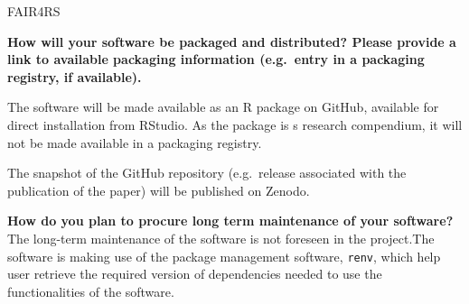\documentclass[
  letterpaper,
  DIV=11,
  numbers=noendperiod]{scrartcl}
\begin{document}
FAIR4RS

\textbf{How will your software be packaged and distributed? Please
provide a link to available packaging information (e.g.~entry in a
packaging registry, if available).}

The software will be made available as an R package on GitHub, available
for direct installation from RStudio. As the package is s research
compendium, it will not be made available in a packaging registry.

The snapshot of the GitHub repository (e.g.~release associated with the
publication of the paper) will be published on Zenodo.

\textbf{How do you plan to procure long term maintenance of your
software?} The long-term maintenance of the software is not foreseen in
the project.The software is making use of the package management
software, \texttt{renv}, which help user retrieve the required version
of dependencies needed to use the functionalities of the software.
\end{document}
